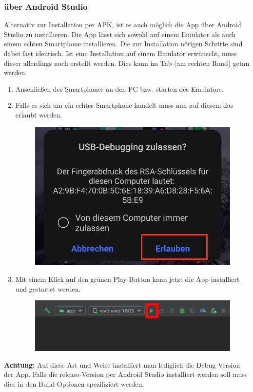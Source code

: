 \documentclass{article}
\begin{document}
\subsubsection{über Android Studio}
Alternativ zur Installation per APK, ist es auch möglich die App über Android Studio zu installieren. 
Die App lässt sich sowohl auf einem Emulator als auch einem echten Smartphone installieren.
Die zur Installation nötigen Schritte sind dabei fast identisch. Ist eine Installation auf einem Emulator erwünscht,
muss dieser allerdings noch erstellt werden. Dies kann im Tab  (am rechten Rand) getan werden.
\begin{enumerate}
    \item Anschließen des Smartphones an den PC bzw. starten des Emulators.
    \item Falls es sich um ein echtes Smartphone handelt muss nun auf diesem das  erlaubt werden.
        \begin{figure}[H]
            \includegraphics[scale=0.8]{21.jpg}
            \centering
        \end{figure}
    \item Mit einem Klick auf den grünen Play-Button kann jetzt die App installiert und gestartet werden. 
        \begin{figure}[H]
            \includegraphics[scale=0.6]{22.png}
            \centering
        \end{figure}
\end{enumerate}
\textbf{Achtung:} Auf diese Art und Weise installiert man lediglich die Debug-Version der App. Falls die release-Version 
per Android Studio installiert werden soll muss dies in den Build-Optionen spezifiziert werden.
\end{document}

